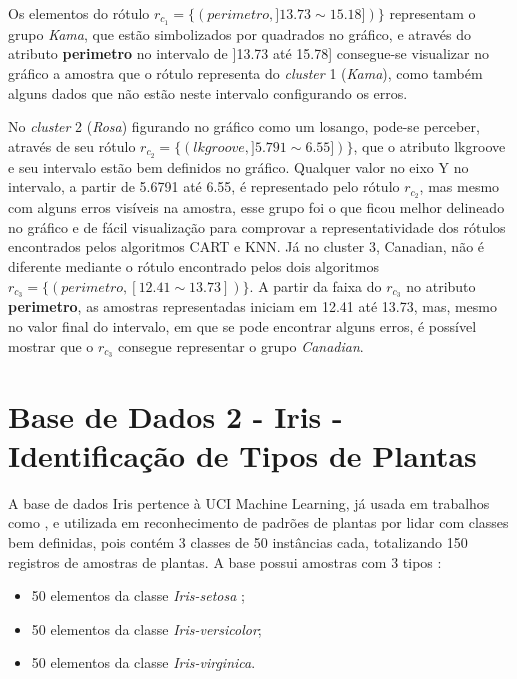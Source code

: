 Os elementos do rótulo ${r_{c_1}=\{ (perimetro, ]13.73 \sim 15.18]) \} }$ representam o grupo \textit{Kama}, que estão simbolizados por quadrados no gráfico, e através do atributo \textbf{perimetro} no intervalo de ]13.73 até 15.78] consegue-se visualizar no gráfico a amostra que o rótulo representa do \textit{cluster} 1 (\textit{Kama}), como também alguns dados que não estão neste intervalo configurando os erros. 


No \textit{cluster} 2 (\textit{Rosa}) figurando no gráfico como um losango, pode-se perceber, através de seu rótulo ${r_{c_2}=\{ (lkgroove, ] 5.791 \sim  6.55]) \} }$, que o atributo lkgroove e seu intervalo estão bem definidos no gráfico. Qualquer valor no eixo Y no intervalo, a partir de 5.6791 até 6.55, é representado pelo rótulo ${r_{c_2}}$, mas mesmo com alguns erros visíveis na amostra, esse grupo foi o que ficou melhor delineado no gráfico e de fácil visualização para comprovar a representatividade dos rótulos encontrados pelos algoritmos CART e KNN. Já no cluster 3, Canadian, não é diferente mediante o rótulo encontrado pelos dois algoritmos ${r_{c_3}=\{ (perimetro, [12.41 \sim  13.73])\} }$. A partir da faixa do ${r_{c_3}}$ no atributo \textbf{perimetro}, as amostras representadas iniciam em 12.41 até 13.73, mas, mesmo no valor final do intervalo, em que se pode encontrar alguns erros, é possível mostrar que o ${r_{c_3}}$ consegue representar o grupo \textit{Canadian}. 

\section{Base de Dados 2 - Iris - Identificação de Tipos de Plantas}

A base de dados Iris pertence à UCI Machine Learning, já usada em trabalhos como , e utilizada em reconhecimento de padrões de plantas por lidar com classes bem definidas, pois contém 3 classes de 50 instâncias cada, totalizando 150 registros de amostras de plantas. A base possui amostras com 3 tipos \cite{FISHER1936}: 

\begin{itemize}[noitemsep]
 \item 50 elementos da classe \textit{Iris-setosa} ;
 \item 50 elementos da classe \textit{Iris-versicolor};
 \item 50 elementos da classe \textit{Iris-virginica}.
\end{itemize}

